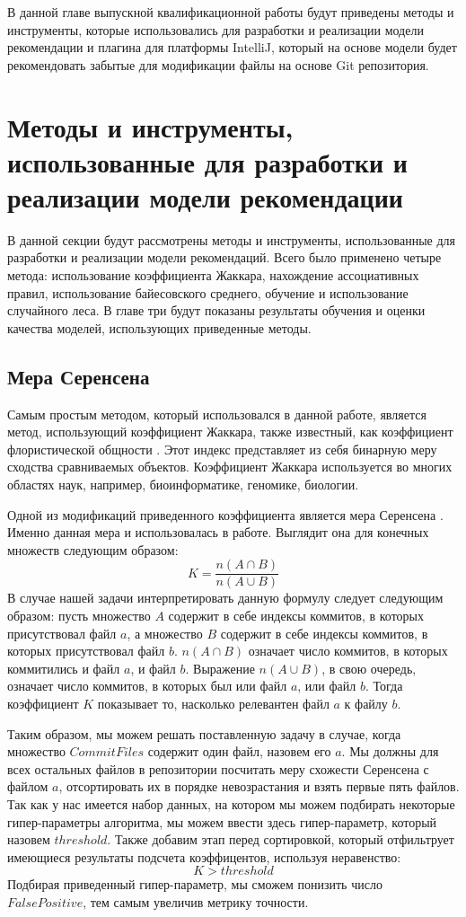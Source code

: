 В данной главе выпускной квалификационной работы будут приведены методы и инструменты, которые использовались для разработки и реализации модели рекомендации и плагина для платформы IntelliJ, который на основе модели будет рекомендовать забытые для модификации файлы на основе Git репозитория.

\section{Методы и инструменты, использованные для разработки и реализации модели рекомендации}\label{chapter2-models}
В данной секции будут рассмотрены методы и инструменты, использованные для разработки и реализации модели рекомендаций. Всего было применено четыре метода: использование коэффициента Жаккара, нахождение ассоциативных правил, использование байесовского среднего, обучение и использование случайного леса. В главе три будут показаны результаты обучения и оценки качества моделей, использующих приведенные методы.
    \subsection{Мера Серенсена}\label{chapter-2-coef}
Самым простым методом, который использовался в данной работе, является метод, использующий коэффициент Жаккара, также известный, как коэффициент флористической общности \cite{jacard}. Этот индекс представляет из себя бинарную меру сходства сравниваемых объектов. Коэффициент Жаккара используется во многих областях наук, например, биоинформатике, геномике, биологии. 

Одной из модификаций приведенного коэффициента является мера Серенсена \cite{jacard2}. Именно данная мера и использовалась в работе. Выглядит она для конечных множеств следующим образом:
    $$K = \frac{n(A \cap B)}{n(A \cup B)}$$
В случае нашей задачи интерпретировать данную формулу следует следующим образом: пусть множество $A$ содержит в себе индексы коммитов, в которых присутствовал файл $a$, а множество $B$ содержит в себе индексы коммитов, в которых присутствовал файл $b$. $n(A \cap B)$ означает число коммитов, в которых коммитились и файл $a$, и файл $b$. Выражение $n(A \cup B)$, в свою очередь, означает число коммитов, в которых был или файл $a$, или файл $b$. Тогда коэффициент $K$ показывает то, насколько релевантен файл $a$ к файлу $b$. 

Таким образом, мы можем решать поставленную задачу в случае, когда множество $CommitFiles$ содержит один файл, назовем его $a$. Мы должны для всех остальных файлов в репозитории посчитать меру схожести Серенсена с файлом $a$, отсортировать их в порядке невозрастания и взять первые пять файлов. Так как у нас имеется набор данных, на котором мы можем подбирать некоторые гипер-параметры алгоритма, мы можем ввести здесь гипер-параметр, который назовем $threshold$. Также добавим этап перед сортировкой, который отфильтрует имеющиеся результаты подсчета коэффицентов, используя неравенство: 
    $$K > threshold$$
Подбирая приведенный гипер-параметр, мы сможем понизить число $FalsePositive$, тем самым увеличив метрику точности.

